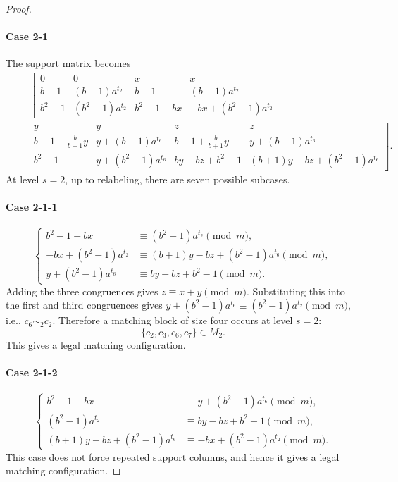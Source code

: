 \documentclass[11pt]{article}
\newcommand{\mymod}{\pmod{m}}
\begin{document}
\begin{proof}
\paragraph{Case 2-1}
The support matrix becomes
\begin{eqnarray*}
		~&~&\left[\begin{array}{cccc}
			0 & 0 
			& x & x \\
            b-1 & (b-1)a^{t_2} 
			& b-1 & (b-1)a^{t_2} \\
            b^2 -1 & (b^2-1)a^{t_2} 
			& b^2-1-bx & -bx+(b^2-1)a^{t_2}
            \end{array}
            \right.\\
			~&~& \left. \begin{array}{cccc}   
			y & y 
			& z & z\\			
			b-1+\frac{b}{b+1}y  & y+(b-1)a^{t_6}
			& b-1+\frac{b}{b+1}y & y+(b-1)a^{t_6}\\
			b^2-1 & y+(b^2-1)a^{t_6}
			& by-bz+b^2-1 & (b+1)y-bz+(b^2-1)a^{t_6}
        \end{array}
        \right]
        .
\end{eqnarray*}
At level $s=2$, up to relabeling, there are seven possible subcases.

\paragraph{Case 2-1-1}
$$
\begin{cases}
	b^2-1-bx &\equiv (b^2-1)a^{t_2}\mymod, \\
	-bx+(b^2-1)a^{t_2} &\equiv (b+1)y-bz+(b^2-1)a^{t_6}\mymod, \\
	y+(b^2-1)a^{t_6} &\equiv by-bz+b^2-1\mymod.
\end{cases}
$$
Adding the three congruences gives $z\equiv x+y\mymod$. Substituting this into the first and third congruences gives
$y+(b^2-1)a^{t_6}\equiv (b^2-1)a^{t_2}\mymod$, i.e., $c_6\sim_2 c_2$. Therefore a matching block of size four occurs at level $s=2$:
$$
\{c_2,c_3,c_6,c_7\}\in M_2.
$$
This gives a legal matching configuration.

\paragraph{Case 2-1-2}
$$
\begin{cases}
	b^2-1-bx &\equiv y+(b^2-1)a^{t_6}\mymod, \\
	(b^2-1)a^{t_2} &\equiv by-bz+b^2-1\mymod, \\
	(b+1)y-bz+(b^2-1)a^{t_6} &\equiv -bx+(b^2-1)a^{t_2}\mymod.
\end{cases}
$$
This case does not force repeated support columns, and hence it gives a legal matching configuration.


\end{proof}
\end{document}
